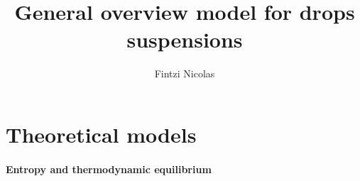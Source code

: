 \documentclass[12pt,a4paper,openany]{My_book}
\title{General overview model for drops suspensions}
\author{Fintzi Nicolas}
\newcommand{\tb}[1]{\color{blue}#1\color{black}}
\begin{document}
\frontmatter


% 
% 
\mainmatter




\part{Theoretical models}


\tb{\subsection{Entropy and thermodynamic equilibrium}}




% 

\end{document}
